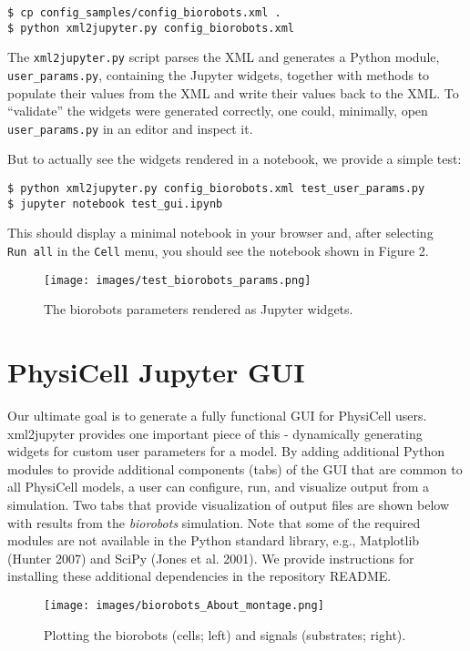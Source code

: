 \documentclass[10pt,letterpaper]{article}
\begin{document}
\begin{verbatim}
$ cp config_samples/config_biorobots.xml .
$ python xml2jupyter.py config_biorobots.xml 
\end{verbatim}

The \texttt{xml2jupyter.py} script parses the XML and generates a Python
module, \texttt{user\_params.py}, containing the Jupyter widgets,
together with methods to populate their values from the XML and write
their values back to the XML. To ``validate'' the widgets were generated
correctly, one could, minimally, open \texttt{user\_params.py} in an
editor and inspect it.

But to actually see the widgets rendered in a notebook, we provide a
simple test:

\begin{verbatim}
$ python xml2jupyter.py config_biorobots.xml test_user_params.py
$ jupyter notebook test_gui.ipynb
\end{verbatim}

This should display a minimal notebook in your browser and, after
selecting \texttt{Run\ all} in the \texttt{Cell} menu, you should see
the notebook shown in Figure 2.

\begin{figure}
\centering
\texttt{[image: images/test\_biorobots\_params.png]}
\caption{The biorobots parameters rendered as Jupyter widgets.}
\end{figure}

\section*{PhysiCell Jupyter GUI}

Our ultimate goal is to generate a fully functional GUI for PhysiCell
users. xml2jupyter provides one important piece of this - dynamically
generating widgets for custom user parameters for a model. By adding
additional Python modules to provide additional components (tabs) of the
GUI that are common to all PhysiCell models, a user can configure, run,
and visualize output from a simulation. Two tabs that provide
visualization of output files are shown below with results from the
\emph{biorobots} simulation. Note that some of the required modules are
not available in the Python standard library, e.g., Matplotlib (Hunter
2007) and SciPy (Jones et al. 2001). We provide instructions for
installing these additional dependencies in the repository README.

\begin{figure}
\centering
\texttt{[image: images/biorobots\_About\_montage.png]}
\caption{Plotting the biorobots (cells; left) and signals (substrates;
right).}
\end{figure}
\end{document}
